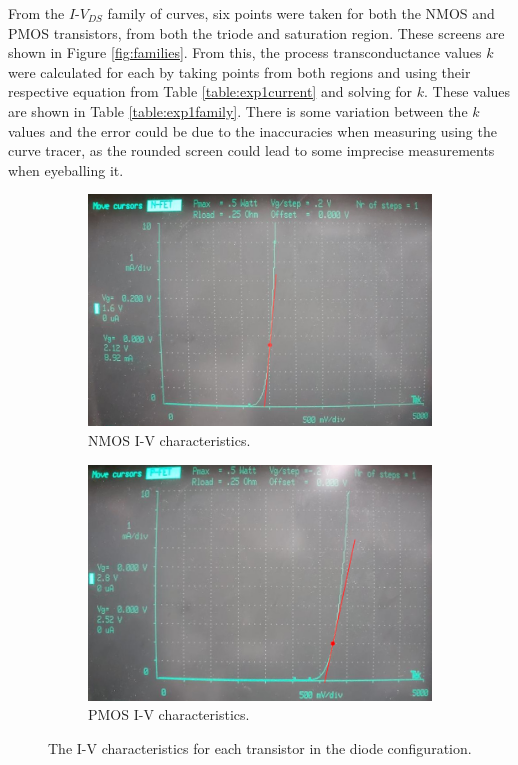 \documentclass{report}
\begin{document}
From the $I$-$V_{DS}$ family of curves, six points were taken for both the NMOS and PMOS transistors, from both the triode and saturation region. These screens are shown in Figure \ref{fig:families}. From this, the process transconductance values $k$ were calculated for each by taking points from both regions and using their respective equation from Table \ref{table:exp1current} and solving for $k$. These values are shown in Table \ref{table:exp1family}. There is some variation between the $k$ values and the error could be due to the inaccuracies when measuring using the curve tracer, as the rounded screen could lead to some imprecise measurements when eyeballing it.

\begin{figure}[H]
	\centering
	\begin{subfigure}{0.45\textwidth}
		\includegraphics[width=\linewidth]{screennfet}
		\caption{NMOS I-V characteristics.}
		\label{fig:screennfet}
	\end{subfigure}
	\hfill
	\begin{subfigure}{0.45\textwidth}
		\includegraphics[width=\linewidth]{screenpfet}
		\caption{PMOS I-V characteristics.}
		\label{fig:screenpfet}
	\end{subfigure}
	\caption{The I-V characteristics for each transistor in the diode configuration.}
	\label{fig:diodes}
\end{figure}
\end{document}
